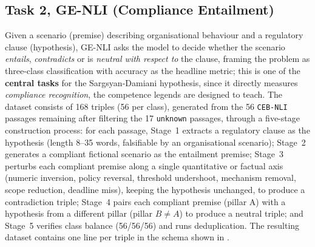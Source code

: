 \documentclass[pdflatex, sn-apa]{sn-jnl}%
\theoremstyle{thmstyleone}%
\theoremstyle{thmstyletwo}%
\theoremstyle{thmstylethree}%
\begin{document}
\subsection{Task 2, GE-NLI (Compliance Entailment)}
\label{sec:bench:nli}
Given a scenario (premise) describing organisational behaviour and a regulatory
clause (hypothesis), GE-NLI asks the model to decide whether the scenario
\emph{entails}, \emph{contradicts} or is \emph{neutral with respect to} the
clause, framing the problem as three-class classification with accuracy as the
headline metric; this is one of the \textbf{central tasks} for the
Sargsyan-Damiani hypothesis, since it directly measures \emph{compliance
recognition}, the competence legends are designed to teach. The dataset consists
of 168 triples (56 per class), generated from the 56 \texttt{CEB-NLI} passages
remaining after filtering the 17 \texttt{unknown} passages, through a five-stage
construction process: for each passage, Stage~1 extracts a regulatory clause as
the hypothesis (length 8--35 words, falsifiable by an organisational scenario);
Stage~2 generates a compliant fictional scenario as the entailment premise;
Stage~3 perturbs each compliant premise along a single quantitative or factual
axis (numeric inversion, policy reversal, threshold undershoot, mechanism
removal, scope reduction, deadline miss), keeping the hypothesis unchanged, to
produce a contradiction triple; Stage~4 pairs each compliant premise (pillar A)
with a hypothesis from a different pillar (pillar $B\neq A$) to produce a neutral
triple; and Stage~5 verifies class balance (56/56/56) and runs deduplication. The
resulting dataset contains one line per triple in the schema shown in
.



\end{document}
